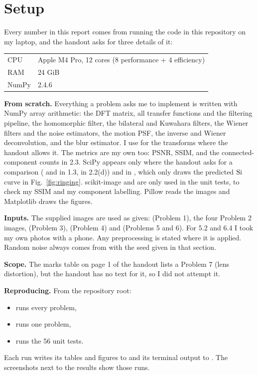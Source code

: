 \section*{Setup}

Every number in this report comes from running the code in this repository on
my laptop, and the handout asks for three details of it:

\begin{center}
\begin{tabular}{ll}
\toprule
CPU & Apple M4 Pro, 12 cores (8 performance + 4 efficiency)\\
RAM & 24 GiB\\
NumPy & 2.4.6\\
\bottomrule
\end{tabular}
\end{center}

\textbf{From scratch.} Everything a problem asks me to implement is written with
NumPy array arithmetic: the DFT matrix, all transfer functions and the filtering
pipeline, the homomorphic filter, the bilateral and Kuwahara filters, the Wiener
filters and the noise estimators, the motion PSF, the inverse and Wiener
deconvolution, and the blur estimator. I use  for the transforms
where the handout allows it. The metrics are my own too: PSNR, SSIM, and the
connected-component counts in 2.3. SciPy appears only where the handout asks for
a comparison ( and  in 1.3,
 in 2.2(d)) and in ,
which only draws the predicted $\operatorname{Si}$ curve in Fig.~\ref{fig:ringing}.
scikit-image and  are only used in the unit tests, to
check my SSIM and my component labelling. Pillow reads the images and Matplotlib
draws the figures.

\textbf{Inputs.} The supplied images are used as given: 
(Problem 1), the four Problem 2 images,  (Problem 3),
 (Problem 4) and  (Problems 5 and 6).
For 5.2 and 6.4 I took my own photos with a phone. Any preprocessing is stated
where it is applied. Random noise always comes from
 with the seed given in that section.

\textbf{Scope.} The marks table on page 1 of the handout lists a Problem 7 (lens
distortion), but the handout has no text for it, so I did not attempt it.

\textbf{Reproducing.} From the repository root:
\begin{itemize}
\item {} runs every problem,
\item {} runs one problem,
\item {} runs the 56 unit tests.
\end{itemize}
Each run writes its tables and figures to  and its
terminal output to . The  screenshots
next to the results show those runs.
